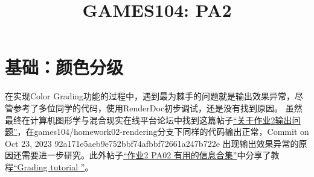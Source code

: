 \documentclass{ctexart}
\title{GAMES104: PA2}
\begin{document}
    
    \maketitle
    
    \section{基础：颜色分级} \label{section:basic1}
    在实现Color Grading功能的过程中，遇到最为棘手的问题就是输出效果异常，尽管参考了多位同学的代码，使用RenderDoc初步调试，还是没有找到原因。
    虽然最终在计算机图形学与混合现实在线平台论坛中找到这篇帖子\href{https://games-cn.org/forums/topic/guanyuzuoye2shuchuwenti/}{“关于作业2输出问题”}，在games104/homework02-rendering分支下同样的代码输出正常，Commit on Oct 23, 2023 92a171e5aeb9e752bbf74afbbf72661a247b722e 出现输出效果异常的原因还需要进一步研究。此外帖子\href{https://games-cn.org/forums/topic/zuoye2-pa02-youyongdexinxiheji/}{“作业2 PA02 有用的信息合集”}中分享了教程\href{https://defold.com/tutorials/grading/}{“Grading tutorial ”}。
    
\end{document}
